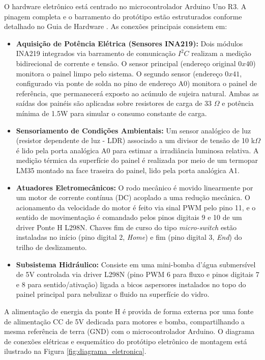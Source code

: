 \documentclass[12pt, a4paper]{article}
\begin{document}
O hardware eletrônico está centrado no microcontrolador Arduino Uno R3. A pinagem completa e o barramento do protótipo estão estruturados conforme detalhado no Guia de Hardware \cite{electronics_guide}. As conexões principais consistem em:
\begin{itemize}
    \item \textbf{Aquisição de Potência Elétrica (Sensores INA219):} Dois módulos INA219 integrados via barramento de comunicação $I^2C$ realizam a medição bidirecional de corrente e tensão. O sensor principal (endereço original $0x40$) monitora o painel limpo pelo sistema. O segundo sensor (endereço $0x41$, configurado via ponte de solda no pino de endereço A0) monitora o painel de referência, que permanecerá exposto ao acúmulo de sujeira natural. Ambas as saídas dos painéis são aplicadas sobre resistores de carga de 33 $\Omega$ e potência mínima de 1.5W para simular o consumo constante de carga.
    \item \textbf{Sensoriamento de Condições Ambientais:} Um sensor analógico de luz (resistor dependente de luz - LDR) associado a um divisor de tensão de 10 k$\Omega$ é lido pela porta analógica A0 para estimar a irradiância luminosa relativa. A medição térmica da superfície do painel é realizada por meio de um termopar LM35 montado na face traseira do painel, lido pela porta analógica A1.
    \item \textbf{Atuadores Eletromecânicos:} O rodo mecânico é movido linearmente por um motor de corrente contínua (DC) acoplado a uma redução mecânica. O acionamento da velocidade do motor é feito via sinal PWM pelo pino 11, e o sentido de movimentação é comandado pelos pinos digitais 9 e 10 de um driver Ponte H L298N. Chaves fim de curso do tipo \textit{micro-switch} estão instaladas no início (pino digital 2, \textit{Home}) e fim (pino digital 3, \textit{End}) do trilho de deslizamento.
    \item \textbf{Subsistema Hidráulico:} Consiste em uma mini-bomba d'água submersível de 5V controlada via driver L298N (pino PWM 6 para fluxo e pinos digitais 7 e 8 para sentido/ativação) ligada a bicos aspersores instalados no topo do painel principal para nebulizar o fluido na superfície do vidro.
\end{itemize}

A alimentação de energia da ponte H é provida de forma externa por uma fonte de alimentação CC de 5V dedicada para motores e bomba, compartilhando a mesma referência de terra (GND) com o microcontrolador Arduino. O diagrama de conexões elétricas e esquemático do protótipo eletrônico de montagem está ilustrado na Figura \ref{fig:diagrama_eletronica}.
\end{document}
